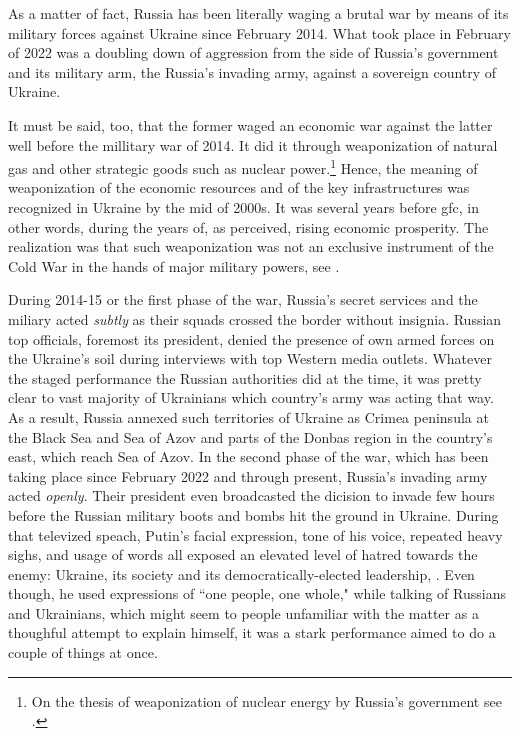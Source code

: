 As a matter of fact, Russia has been literally waging a brutal war by means of its military forces against Ukraine since February 2014. What took place in February of 2022 was a doubling down of aggression from the side of Russia's government and its military arm, the Russia's invading army, against a sovereign country of Ukraine. 

It must be said, too, that the former waged an economic war against the latter well before the millitary war of 2014. It did it through weaponization of natural gas and other strategic goods such as nuclear power.\footnote{On the thesis of weaponization of nuclear energy by Russia's government see \citep{un2023,un2024}.} Hence, the meaning of weaponization of the economic resources and of the key infrastructures was recognized in Ukraine by the mid of 2000s. It was several years before \ac{gfc}, in other words, during the years of, as perceived, rising economic prosperity. The realization was that such weaponization was not an exclusive instrument of the Cold War in the hands of major military powers, see \citep{gazprom2008,farrell2019,farrell2023}. 

During 2014-15 or the first phase of the war, Russia's secret services and the miliary acted \textit{subtly} as their squads crossed the border without insignia. Russian top officials, foremost its president, denied the presence of own armed forces on the Ukraine's soil during interviews with top Western media outlets. Whatever the staged performance the Russian authorities did at the time, it was pretty clear to vast majority of Ukrainians which country's army was acting that way. As a result, Russia annexed such territories of Ukraine as Crimea peninsula at the Black Sea and Sea of Azov and parts of the Donbas region in the country's east, which reach Sea of Azov. In the second phase of the war, which has been taking place since February 2022 and through present, Russia's invading army acted \textit{openly}. Their president even broadcasted the dicision to invade few hours before the Russian military boots and bombs hit the ground in Ukraine. During that televized speach, Putin's facial expression, tone of his voice, repeated heavy sighs, and usage of words all exposed an elevated level of hatred towards the enemy: Ukraine, its society and its democratically-elected leadership, \citep[see][]{kremlin2022}. Even though, he used expressions of ``one people, one whole," while talking of Russians and Ukrainians, which might seem to people unfamiliar with the matter as a thoughful attempt to explain himself, it was a stark performance aimed to do a couple of things at once. 

